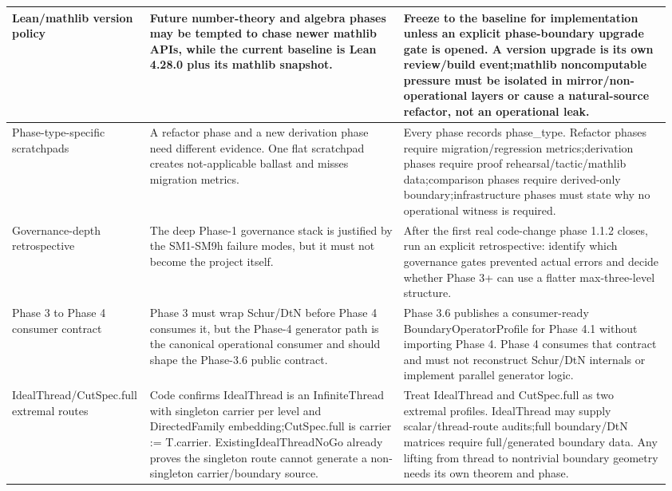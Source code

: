\begin{longtable}{L{0.18\linewidth} L{0.38\linewidth} L{0.4\linewidth}}
\hline
\addlinespace[0.24em]
Lean/\allowbreak{}mathlib version policy & Future number-theory and algebra phases may be tempted to chase newer mathlib APIs, while the current baseline is Lean 4.28.0 plus its mathlib snapshot. & Freeze to the baseline for implementation unless an explicit phase-boundary upgrade gate is opened. A version upgrade is its own review/\allowbreak{}build event;\newline mathlib noncomputable pressure must be isolated in mirror/\allowbreak{}non-operational layers or cause a natural-source refactor, not an operational leak.\\
\hline
\addlinespace[0.24em]
Phase-type-specific scratchpads & A refactor phase and a new derivation phase need different evidence. One flat scratchpad creates not-applicable ballast and misses migration metrics. & Every phase records phase\_type. Refactor phases require migration/\allowbreak{}regression metrics;\newline derivation phases require proof rehearsal/\allowbreak{}tactic/\allowbreak{}mathlib data;\newline comparison phases require derived-only boundary;\newline infrastructure phases must state why no operational witness is required.\\
\hline
\addlinespace[0.24em]
Governance-depth retrospective & The deep Phase-1 governance stack is justified by the SM1-SM9h failure modes, but it must not become the project itself. & After the first real code-change phase 1.1.2 closes, run an explicit retrospective: identify which governance gates prevented actual errors and decide whether Phase 3+ can use a flatter max-three-level structure.\\
\hline
\addlinespace[0.24em]
Phase 3 to Phase 4 consumer contract & Phase 3 must wrap Schur/\allowbreak{}DtN before Phase 4 consumes it, but the Phase-4 generator path is the canonical operational consumer and should shape the Phase-3.6 public contract. & Phase 3.6 publishes a consumer-ready BoundaryOperatorProfile for Phase 4.1 without importing Phase 4. Phase 4 consumes that contract and must not reconstruct Schur/\allowbreak{}DtN internals or implement parallel generator logic.\\
\hline
\addlinespace[0.24em]
IdealThread/\allowbreak{}CutSpec.full extremal routes & Code confirms IdealThread is an InfiniteThread with singleton carrier per level and DirectedFamily embedding;\newline CutSpec.full is carrier := T.carrier. ExistingIdealThreadNoGo already proves the singleton route cannot generate a non-singleton carrier/\allowbreak{}boundary source. & Treat IdealThread and CutSpec.full as two extremal profiles. IdealThread may supply scalar/\allowbreak{}thread-route audits;\newline full boundary/\allowbreak{}DtN matrices require full/\allowbreak{}generated boundary data. Any lifting from thread to nontrivial boundary geometry needs its own theorem and phase.\\

\end{longtable}
